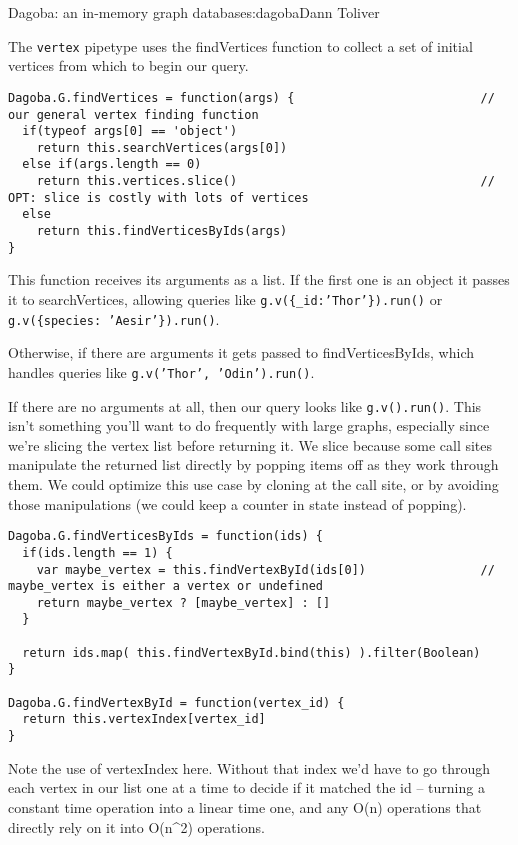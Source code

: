 \begin{aosachapter}{Dagoba: an in-memory graph database}{s:dagoba}{Dann Toliver}
\label{finding}

The \texttt{vertex} pipetype uses the findVertices function to collect a
set of initial vertices from which to begin our query.

\begin{verbatim}
Dagoba.G.findVertices = function(args) {                          // our general vertex finding function
  if(typeof args[0] == 'object')
    return this.searchVertices(args[0])
  else if(args.length == 0)
    return this.vertices.slice()                                  // OPT: slice is costly with lots of vertices
  else
    return this.findVerticesByIds(args)
}
\end{verbatim}

This function receives its arguments as a list. If the first one is an
object it passes it to searchVertices, allowing queries like
\texttt{g.v(\{\_id:'Thor'\}).run()} or
\texttt{g.v(\{species: 'Aesir'\}).run()}.

Otherwise, if there are arguments it gets passed to findVerticesByIds,
which handles queries like \texttt{g.v('Thor', 'Odin').run()}.

If there are no arguments at all, then our query looks like
\texttt{g.v().run()}. This isn't something you'll want to do frequently
with large graphs, especially since we're slicing the vertex list before
returning it. We slice because some call sites manipulate the returned
list directly by popping items off as they work through them. We could
optimize this use case by cloning at the call site, or by avoiding those
manipulations (we could keep a counter in state instead of popping).

\begin{verbatim}
Dagoba.G.findVerticesByIds = function(ids) {
  if(ids.length == 1) {
    var maybe_vertex = this.findVertexById(ids[0])                // maybe_vertex is either a vertex or undefined
    return maybe_vertex ? [maybe_vertex] : []
  }
  
  return ids.map( this.findVertexById.bind(this) ).filter(Boolean) 
}

Dagoba.G.findVertexById = function(vertex_id) {
  return this.vertexIndex[vertex_id] 
}
\end{verbatim}

Note the use of vertexIndex here. Without that index we'd have to go
through each vertex in our list one at a time to decide if it matched
the id -- turning a constant time operation into a linear time one, and
any O(n) operations that directly rely on it into O(n\^{}2) operations.


\end{aosachapter}
